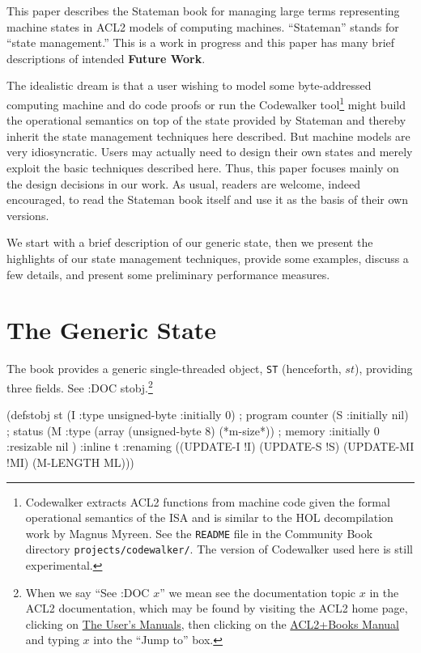 \documentclass[submission,copyright,creativecommons]{eptcs}
\newcommand{\ptt}[1]{\tt{#1}}
\begin{document}
This paper describes the Stateman book for managing large terms representing
machine states in ACL2 models of computing machines.  ``Stateman'' stands for
``state management.''  This is a work in progress and this paper has many
brief descriptions of intended {\bf{Future Work}}.

The idealistic dream is that a user wishing to model some byte-addressed
computing machine and do code proofs or run the Codewalker
tool\footnote{Codewalker extracts ACL2 functions from machine code given the
  formal operational semantics of the ISA and is similar to the HOL
  decompilation work by Magnus Myreen\cite{Myreen-09,Myreen-12}.  See the
  {\ptt{README}} file in the Community Book directory
  {\ptt{projects/codewalker/}}.  The version of Codewalker used here is still
      experimental.} might build the operational semantics on top of the
state provided by Stateman and thereby inherit the state management
techniques here described.  But machine models are very idiosyncratic.  Users
may actually need to design their own states and merely exploit the basic
techniques described here.  Thus, this paper focuses mainly on the design
decisions in our work.  As usual, readers are welcome, indeed encouraged, to
read the Stateman book itself and use it as the basis of their own versions.



We start with a brief description of our generic state, then we present the
highlights of our state management techniques, provide some examples, discuss
a few details, and present some preliminary performance measures.

\section{The Generic State}

The book provides a generic single-threaded object, {\ptt{ST}} (henceforth,
$st$), providing three fields.  See :DOC stobj.\footnote{When we say ``See
  :DOC $x$'' we mean see the documentation topic $x$ in the ACL2
  documentation, which may be found by visiting the ACL2 home
  page\cite{acl2-home-page}, clicking on {\underline{The User's Manuals}},
  then clicking on the {\underline{ACL2+Books Manual}} and typing $x$ into
  the ``Jump to'' box.}

\begin{acl2p}
(defstobj st
  (I  :type unsigned-byte :initially 0)          ; program counter
  (S  :initially nil)                            ; status
  (M  :type (array (unsigned-byte 8) (*m-size*)) ; memory
      :initially 0
      :resizable nil
      )
  :inline t
  :renaming
  ((UPDATE-I   !I)
   (UPDATE-S   !S)
   (UPDATE-MI  !MI)
   (M-LENGTH   ML)))
\end{acl2p}
\end{document}
